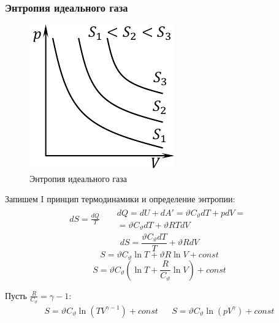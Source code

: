 \subsubsection*{Энтропия идеального газа}
\begin{figure}[H]
	\centering
	\includegraphics[width=0.4\linewidth]{"image/Энтропия идеального газа"}
	\caption{Энтропия идеального газа}
	\label{fig:10}
\end{figure}

Запишем I принцип термодинамики и определение энтропии:
\begin{align*}
	dS = \frac{dQ}{T} && \begin{aligned}
		dQ = dU + dA' = \vartheta C_{\vartheta} dT + pdV = \\
		= \vartheta C_\vartheta dT + \vartheta RTdV
	\end{aligned}
\end{align*}
\[dS = \frac{\vartheta C_\vartheta dT}{T} + \vartheta R dV\]
\[S = \vartheta C_\vartheta \ln T + \vartheta R \ln V + const\]
\[S = \vartheta C_\vartheta (\ln T + \frac{R}{C_\vartheta} \ln V) + const\]

Пусть $\frac{R}{C_\vartheta} = \gamma - 1$:
\begin{align} \label{34.4}
	\boxed{S = \vartheta C_\vartheta \ln (T V^{\gamma - 1}) + const} && \boxed{S = \vartheta C_\vartheta \ln (p V^{\gamma}) + const}
\end{align}
